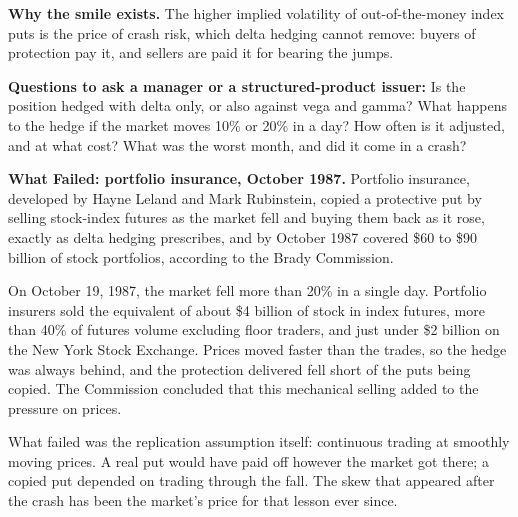 \textbf{Why the smile exists.} The higher implied volatility of out-of-the-money index puts is the price of crash risk, which delta hedging cannot remove: buyers of protection pay it, and sellers are paid it for bearing the jumps.

\textbf{Questions to ask a manager or a structured-product issuer:} Is the position hedged with delta only, or also against vega and gamma? What happens to the hedge if the market moves 10\% or 20\% in a day? How often is it adjusted, and at what cost? What was the worst month, and did it come in a crash?

\begin{callout}
\textbf{What Failed: portfolio insurance, October 1987.} Portfolio insurance, developed by Hayne Leland and Mark Rubinstein, copied a protective put by selling stock-index futures as the market fell and buying them back as it rose, exactly as delta hedging prescribes, and by October 1987 covered \$60 to \$90 billion of stock portfolios, according to the Brady Commission.

On October 19, 1987, the market fell more than 20\% in a single day. Portfolio insurers sold the equivalent of about \$4 billion of stock in index futures, more than 40\% of futures volume excluding floor traders, and just under \$2 billion on the New York Stock Exchange. Prices moved faster than the trades, so the hedge was always behind, and the protection delivered fell short of the puts being copied. The Commission concluded that this mechanical selling added to the pressure on prices.

What failed was the replication assumption itself: continuous trading at smoothly moving prices. A real put would have paid off however the market got there; a copied put depended on trading through the fall. The skew that appeared after the crash has been the market's price for that lesson ever since.
\end{callout}
